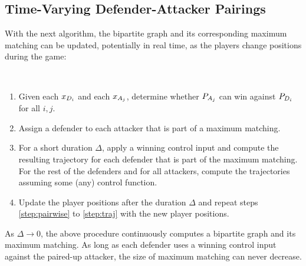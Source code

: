 \subsection{Time-Varying Defender-Attacker Pairings}
\label{subsec:tvarp}
With the next algorithm, the bipartite graph and its corresponding maximum matching can be updated, potentially in real time, as the players change positions during the game:

\begin{alg}~
\begin{enumerate}
\item Given each $x_{D_{i}}$ and each $x_{A_{j}}$, determine whether $P_{A_{j}}$ can win against $P_{D_{i}}$ for all $i,j$. \label{step:pairwise}
\item Assign a defender to each attacker that is part of a maximum matching.
\item For a short duration $\Delta$, apply a winning control input and compute the resulting trajectory for each defender that is part of the maximum matching. For the rest of the defenders and for all attackers, compute the trajectories assuming some (any) control function. \label{step:traj}
\item Update the player positions after the duration $\Delta$ and repeat steps \ref{step:pairwise} to \ref{step:traj}  with the new player positions.
\end{enumerate}
\end{alg}

As $\Delta\rightarrow 0$, the above procedure continuously computes a bipartite graph and its maximum matching. As long as each defender uses a winning control input against the paired-up attacker, the size of maximum matching can never decrease. 


